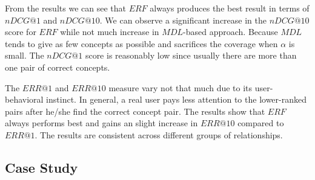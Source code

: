 From the results we can see that $ERF$ always produces the best result in terms of $nDCG@1$ and $nDCG@10$.
We can observe a significant increase in the $nDCG@10$ score for $ERF$ while not much increase in $MDL$-based approach. Because $MDL$ tends to give as few concepts as possible and sacrifices the coverage when $\alpha$ is small. The $nDCG@1$ score is reasonably low since usually there are more than one pair of correct concepts.


The $ERR@1$ and $ERR@10$ measure vary not that much due to its user-behavioral instinct. In general, a real user pays less attention to the lower-ranked pairs after he/she find the correct concept pair.
The results show that 
 $ERF$ always performs best and gains an slight increase in $ERR@10$ compared to $ERR@1$.
 The results are consistent across different groups of relationships.




\subsection{Case Study}

